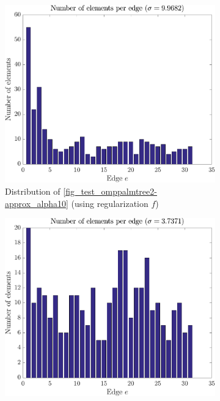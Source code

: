 \begin{figure}[!ht] \centering
\begin{subfigure}[b]{0.325\textwidth}\centering
\includegraphics[width=\textwidth]{figures/tree-unbalanced-supp/histo_alpha10_grad1.pdf}
	\caption{Distribution of \cref{fig_test_omppalmtree2-approx_alpha10} (using regularization $f$)}\label{fig_histo-1}
\end{subfigure}	
\begin{subfigure}[b]{0.325\textwidth}\centering
\includegraphics[width=\textwidth]{figures/tree-gradient-vs-sequential/histo_alpha30_grad1.pdf}

\end{subfigure}
\end{figure}
